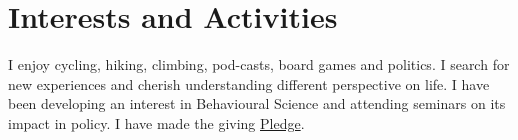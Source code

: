 \documentclass[a4paper,10pt]{article}
\begin{document}
\section{Interests and Activities}
I enjoy cycling, hiking, climbing, pod-casts, board games and politics. I search for new experiences and cherish understanding different perspective on life. I have been developing an interest in Behavioural Science and attending seminars on its impact in policy. I have made the giving \href{https://www.givingwhatwecan.org/}{Pledge}.
\end{document}
